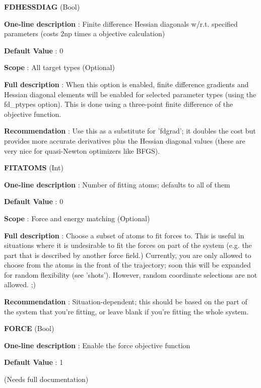 \begin{DoxyItemize}
\item {\bfseries  F\-D\-H\-E\-S\-S\-D\-I\-A\-G } (Bool) \par
{\bfseries  One-\/line description }\-: Finite difference Hessian diagonals w/r.\-t. specified parameters (costs 2np times a objective calculation) \par
{\bfseries  Default Value }\-: 0 \par
{\bfseries  Scope }\-: All target types (Optional) \par
{\bfseries  Full description }\-: When this option is enabled, finite difference gradients and Hessian diagonal elements will be enabled for selected parameter types (using the fd\-\_\-ptypes option). This is done using a three-\/point finite difference of the objective function. \par
{\bfseries  Recommendation }\-: Use this as a substitute for 'fdgrad'; it doubles the cost but provides more accurate derivatives plus the Hessian diagonal values (these are very nice for quasi-\/\-Newton optimizers like B\-F\-G\-S).\end{DoxyItemize}
\begin{DoxyItemize}
\item {\bfseries  F\-I\-T\-A\-T\-O\-M\-S } (Int) \par
{\bfseries  One-\/line description }\-: Number of fitting atoms; defaults to all of them \par
{\bfseries  Default Value }\-: 0 \par
{\bfseries  Scope }\-: Force and energy matching (Optional) \par
{\bfseries  Full description }\-: Choose a subset of atoms to fit forces to. This is useful in situations where it is undesirable to fit the forces on part of the system (e.\-g. the part that is described by another force field.) Currently, you are only allowed to choose from the atoms in the front of the trajectory; soon this will be expanded for random flexibility (see 'shots'). However, random coordinate selections are not allowed. ;) \par
{\bfseries  Recommendation }\-: Situation-\/dependent; this should be based on the part of the system that you're fitting, or leave blank if you're fitting the whole system.\end{DoxyItemize}
\begin{DoxyItemize}
\item {\bfseries  F\-O\-R\-C\-E } (Bool) \par
{\bfseries  One-\/line description }\-: Enable the force objective function \par
{\bfseries  Default Value }\-: 1 \par
(Needs full documentation)\end{DoxyItemize}
